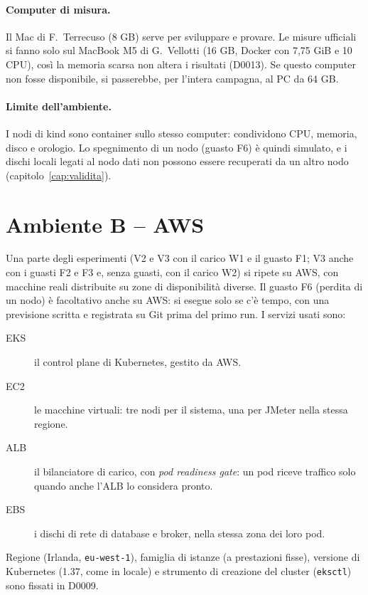 \paragraph{Computer di misura.} Il Mac di F.~Terrecuso (8 GB) serve per sviluppare e provare. Le misure ufficiali si fanno solo sul MacBook M5 di G.~Vellotti (16 GB, Docker con 7,75 GiB e 10 CPU), così la memoria scarsa non altera i risultati (D0013). Se questo computer non fosse disponibile, si passerebbe, per l'intera campagna, al PC da 64 GB.

\paragraph{Limite dell'ambiente.} I nodi di kind sono container sullo stesso computer: condividono CPU, memoria, disco e orologio. Lo spegnimento di un nodo (guasto F6) è quindi simulato, e i dischi locali legati al nodo dati non possono essere recuperati da un altro nodo (capitolo~\ref{cap:validita}).

\section{Ambiente B -- AWS}
\label{sec:aws}

Una parte degli esperimenti (V2 e V3 con il carico W1 e il guasto F1; V3 anche con i guasti F2 e F3 e, senza guasti, con il carico W2) si ripete su AWS, con macchine reali distribuite su zone di disponibilità diverse. Il guasto F6 (perdita di un nodo) è facoltativo anche su AWS: si esegue solo se c'è tempo, con una previsione scritta e registrata su Git prima del primo run. I servizi usati sono:

\begin{description}
  \item[EKS] il control plane di Kubernetes, gestito da AWS.
  \item[EC2] le macchine virtuali: tre nodi per il sistema, una per JMeter nella stessa regione.
  \item[ALB] il bilanciatore di carico, con \textit{pod readiness gate}: un pod riceve traffico solo quando anche l'ALB lo considera pronto.
  \item[EBS] i dischi di rete di database e broker, nella stessa zona dei loro pod.
\end{description}

Regione (Irlanda, \texttt{eu-west-1}), famiglia di istanze (a prestazioni fisse), versione di Kubernetes (1.37, come in locale) e strumento di creazione del cluster (\texttt{eksctl}) sono fissati in D0009.

